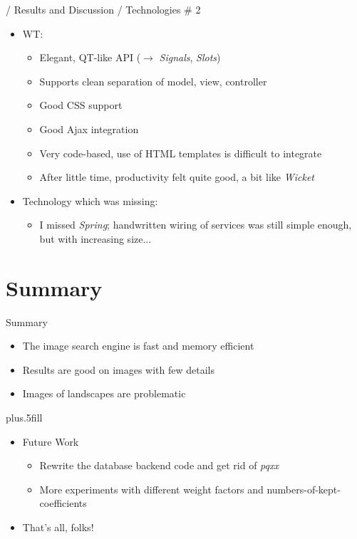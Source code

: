 \documentclass{beamer}
\newcommand\rarrow{$\longrightarrow$ } %
\begin{document}
\begin{frame}{/ Results and Discussion / Technologies \# 2}

  \begin{itemize}
  \item WT:
    \begin{itemize}
    \item Elegant, QT-like API (\rarrow \emph{Signals}, \emph{Slots})
    \item Supports clean separation of model, view, controller
    \item Good CSS support
    \item Good Ajax integration
    \item Very code-based, use of HTML templates is difficult to
      integrate
    \item After little time, productivity felt quite good, a bit like
      \emph{Wicket}
    \end{itemize}
    \pause
  \item Technology which was missing:
    \begin{itemize}
    \item I missed \emph{Spring}; handwritten wiring of services was
      still simple enough, but with increasing size...
    \end{itemize}
  \end{itemize}
  
\end{frame}

\section*{Summary}

\begin{frame}{Summary}

  \begin{itemize}
  \item The image search engine is fast and memory efficient
  \item Results are good on images with few details
  \item Images of landscapes are problematic
  \end{itemize}
  
  \pause
  \vskip0pt plus.5fill
  \begin{itemize}
  \item Future Work
    \begin{itemize}
    \item Rewrite the database backend code and get rid of \emph{pqxx}
    \item More experiments with different weight factors and
      numbers-of-kept-coefficients
    \end{itemize}
    \pause
  \item That's all, folks!
  \end{itemize}
\end{frame}
\end{document}
